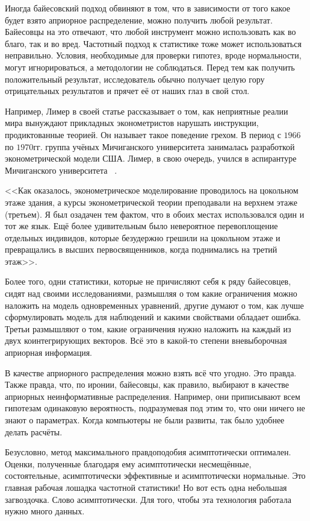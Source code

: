 Иногда байесовский подход обвиняют в том, что в зависимости от того какое будет взято априорное распределение, можно получить любой результат. Байесовцы на это отвечают, что любой инструмент можно использовать как во благо, так и во вред. Частотный подход к статистике тоже может использоваться неправильно. Условия, необходимые для проверки гипотез, вроде нормальности, могут игнорироваться, а методологии не соблюдаться. Перед тем как получить положительный результат, исследователь обычно получает целую гору отрицательных результатов и прячет её от наших глаз в свой стол.

Например, Лимер в своей статье рассказывает о том, как неприятные реалии мира вынуждают прикладных эконометристов нарушать инструкции, продиктованные теорией. Он называет такое поведение грехом. В период с $1966$ по $1970$гг. группа учёных Мичиганского университета занималась разработкой эконометрической модели США. Лимер, в свою очередь, учился в аспирантуре Мичиганского университета~ \cite{leamer1978specification}.

<<Как оказалось, эконометрическое моделирование проводилось на цокольном этаже здания, а курсы эконометрической теории преподавали на верхнем этаже (третьем). Я был озадачен тем фактом, что в обоих местах использовался один и тот же язык. Ещё более удивительным было невероятное перевоплощение отдельных индивидов, которые безудержно грешили на цокольном этаже и превращались в высших первосвященников, когда поднимались на третий этаж>>.

Более того, одни статистики, которые не причисляют себя к ряду байесовцев, сидят над своими исследованиями, размышляя о том какие ограничения можно наложить на модель одновременных уравнений, другие думают о том, как лучше сформулировать модель для наблюдений и какими свойствами обладает ошибка. Третьи размышляют о том, какие ограничения нужно наложить на каждый из двух коинтегрирующих векторов. Всё это в какой-то степени вневыборочная априорная информация.

В качестве априорного распределения можно взять всё что угодно. Это правда. Также правда, что, по иронии, байесовцы, как правило, выбирают в качестве априорных неинформативные распределения. Например, они приписывают всем гипотезам одинаковую вероятность, подразумевая под этим то, что они ничего не знают о параметрах. Когда компьютеры не были развиты, так было удобнее делать расчёты.

Безусловно, метод максимального правдоподобия асимптотически оптимален. Оценки, полученные благодаря ему асимптотически несмещённые, состоятельные, асимптотически эффективные и асимптотически нормальные. Это главная рабочая лошадка частотной статистики! Но вот есть одна небольшая загвоздочка. Слово асимптотически. Для того, чтобы эта технология работала нужно много данных. 

